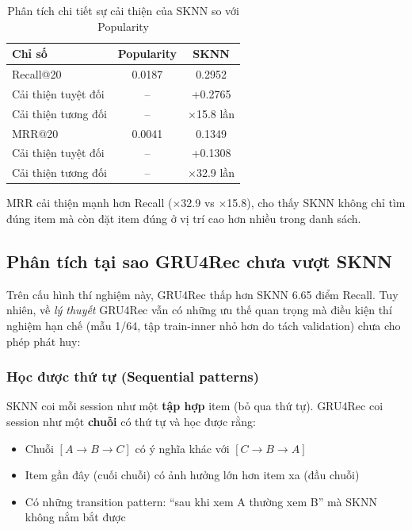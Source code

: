 \documentclass[12pt, a4paper]{article}
\begin{document}
\begin{table}[H]
\centering
\caption{Phân tích chi tiết sự cải thiện của SKNN so với Popularity}
\label{tab:sknn_vs_pop}
\begin{tabular}{lcc}
\toprule
\textbf{Chỉ số} & \textbf{Popularity} & \textbf{SKNN} \\
\midrule
Recall@20 & 0.0187 & 0.2952 \\
Cải thiện tuyệt đối & -- & +0.2765 \\
Cải thiện tương đối & -- & $\times$15.8 lần \\
\midrule
MRR@20 & 0.0041 & 0.1349 \\
Cải thiện tuyệt đối & -- & +0.1308 \\
Cải thiện tương đối & -- & $\times$32.9 lần \\
\bottomrule
\end{tabular}
\end{table}

MRR cải thiện mạnh hơn Recall ($\times$32.9 vs $\times$15.8), cho thấy SKNN không chỉ tìm đúng item mà còn đặt item đúng ở vị trí cao hơn nhiều trong danh sách.

\subsection{Phân tích tại sao GRU4Rec chưa vượt SKNN}

Trên cấu hình thí nghiệm này, GRU4Rec thấp hơn SKNN 6.65 điểm Recall. Tuy nhiên, về \emph{lý thuyết} GRU4Rec vẫn có những ưu thế quan trọng mà điều kiện thí nghiệm hạn chế (mẫu 1/64, tập train-inner nhỏ hơn do tách validation) chưa cho phép phát huy:

\subsubsection{Học được thứ tự (Sequential patterns)}

SKNN coi mỗi session như một \textbf{tập hợp} item (bỏ qua thứ tự). GRU4Rec coi session như một \textbf{chuỗi} có thứ tự và học được rằng:
\begin{itemize}
    \item Chuỗi $[A \rightarrow B \rightarrow C]$ có ý nghĩa khác với $[C \rightarrow B \rightarrow A]$
    \item Item gần đây (cuối chuỗi) có ảnh hưởng lớn hơn item xa (đầu chuỗi)
    \item Có những transition pattern: ``sau khi xem A thường xem B'' mà SKNN không nắm bắt được
\end{itemize}
\end{document}
